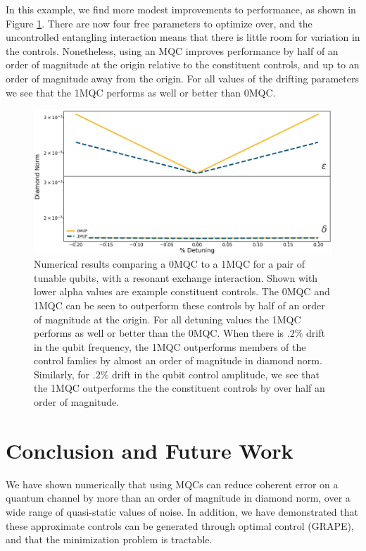 \documentclass[aps,nofootinbib,pra,notitlepage,twocolumn]{revtex4-1}
\begin{document}
In this example, we find more modest improvements to performance, as shown in Figure \ref{fig:2MQC}. There are now four free parameters to optimize over, and the uncontrolled entangling interaction means that there is little room for variation in the controls. Nonetheless, using an MQC improves performance by half of an order of magnitude at the origin relative to the constituent controls, and up to an order of magnitude away from the origin. For all values of the drifting parameters we see that the 1MQC performs as well or better than 0MQC.

\begin{figure}
  \centering
  \includegraphics[width=\columnwidth]{2QRBC_no_member.png}
  \caption{Numerical results comparing a 0MQC to a 1MQC for a pair of tunable qubits, with a resonant exchange interaction. Shown with lower alpha values are example constituent controls. The 0MQC and 1MQC can be seen to outperform these controls by half of an order of magnitude at the origin. For all detuning values the 1MQC performs as well or better than the 0MQC. When there is $.2\%$ drift in the qubit frequency, the 1MQC outperforms members of the control famlies by almost an order of magnitude in diamond norm. Similarly, for $.2\%$ drift in the qubit control amplitude, we see that the 1MQC outperforms the the constituent controls by over half an order of magnitude.}
  \label{fig:2MQC}
\end{figure}








\section{Conclusion and Future Work}
We have shown numerically that using MQCs can reduce coherent error on a quantum channel by more than an order of magnitude in diamond norm, over a wide range of quasi-static values of noise. In addition, we have demonstrated that these approximate controls can be generated through optimal control (GRAPE), and that the minimization problem is tractable.
\end{document}
